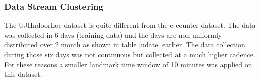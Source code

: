 \documentclass[../UNBThesis2.tex]{subfiles}
\begin{document}
\begin{itemize}



\end{itemize}


\subsubsection{Data Stream Clustering} 
The UJIIndoorLoc dataset is quite different from the e-counter dataset. The data was collected in 6 days (training data) and the days are non-uniformly distributed over 2 month as shown in table \ref{udate} earlier. The data collection during those six days was not continuous but collected at a much higher cadence. For these reasons a smaller landmark time window of 10 minutes was applied on this dataset.
\end{document}
